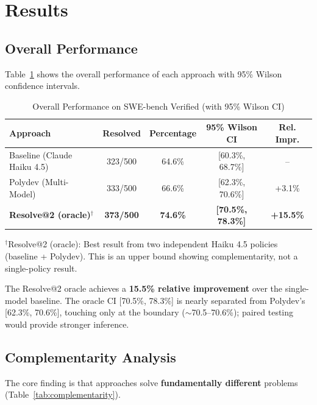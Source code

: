 \documentclass[11pt,a4paper]{article}
\begin{document}
\section{Results}

\subsection{Overall Performance}

Table~\ref{tab:overall_results} shows the overall performance of each approach with 95\% Wilson confidence intervals.

\begin{table}[h]
\centering
\caption{Overall Performance on SWE-bench Verified (with 95\% Wilson CI)}
\label{tab:overall_results}
\begin{tabular}{lcccc}
\toprule
\textbf{Approach} & \textbf{Resolved} & \textbf{Percentage} & \textbf{95\% Wilson CI} & \textbf{Rel. Impr.} \\
\midrule
Baseline (Claude Haiku 4.5) & 323/500 & 64.6\% & [60.3\%, 68.7\%] & -- \\
Polydev (Multi-Model) & 333/500 & 66.6\% & [62.3\%, 70.6\%] & +3.1\% \\
\textbf{Resolve@2 (oracle)}$^\dagger$ & \textbf{373/500} & \textbf{74.6\%} & \textbf{[70.5\%, 78.3\%]} & \textbf{+15.5\%} \\
\bottomrule
\end{tabular}
\vspace{0.5em}
\small{$^\dagger$Resolve@2 (oracle): Best result from two independent Haiku 4.5 policies (baseline + Polydev). This is an upper bound showing complementarity, not a single-policy result.}
\end{table}

The Resolve@2 oracle achieves a \textbf{15.5\% relative improvement} over the single-model baseline. The oracle CI [70.5\%, 78.3\%] is nearly separated from Polydev's [62.3\%, 70.6\%], touching only at the boundary ($\sim$70.5--70.6\%); paired testing would provide stronger inference.

\subsection{Complementarity Analysis}

The core finding is that approaches solve \textbf{fundamentally different} problems (Table~\ref{tab:complementarity}).
\end{document}
